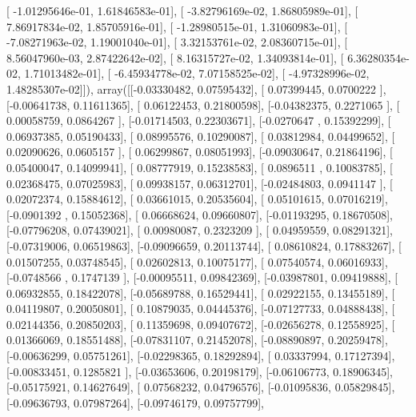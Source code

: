\documentclass{article}
\begin{document}
       [ -1.01295646e-01,   1.61846583e-01],
       [ -3.82796169e-02,   1.86805989e-01],
       [  7.86917834e-02,   1.85705916e-01],
       [ -1.28980515e-01,   1.31060983e-01],
       [ -7.08271963e-02,   1.19001040e-01],
       [  3.32153761e-02,   2.08360715e-01],
       [  8.56047960e-03,   2.87422642e-02],
       [  8.16315727e-02,   1.34093814e-01],
       [  6.36280354e-02,   1.71013482e-01],
       [ -6.45934778e-02,   7.07158525e-02],
       [ -4.97328996e-02,   1.48285307e-02]]), array([[-0.03330482,  0.07595432],
       [ 0.07399445,  0.0700222 ],
       [-0.00641738,  0.11611365],
       [ 0.06122453,  0.21800598],
       [-0.04382375,  0.2271065 ],
       [ 0.00058759,  0.0864267 ],
       [-0.01714503,  0.22303671],
       [-0.0270647 ,  0.15392299],
       [ 0.06937385,  0.05190433],
       [ 0.08995576,  0.10290087],
       [ 0.03812984,  0.04499652],
       [ 0.02090626,  0.0605157 ],
       [ 0.06299867,  0.08051993],
       [-0.09030647,  0.21864196],
       [ 0.05400047,  0.14099941],
       [ 0.08777919,  0.15238583],
       [ 0.0896511 ,  0.10083785],
       [ 0.02368475,  0.07025983],
       [ 0.09938157,  0.06312701],
       [-0.02484803,  0.0941147 ],
       [ 0.02072374,  0.15884612],
       [ 0.03661015,  0.20535604],
       [ 0.05101615,  0.07016219],
       [-0.0901392 ,  0.15052368],
       [ 0.06668624,  0.09660807],
       [-0.01193295,  0.18670508],
       [-0.07796208,  0.07439021],
       [ 0.00980087,  0.2323209 ],
       [ 0.04959559,  0.08291321],
       [-0.07319006,  0.06519863],
       [-0.09096659,  0.20113744],
       [ 0.08610824,  0.17883267],
       [ 0.01507255,  0.03748545],
       [ 0.02602813,  0.10075177],
       [ 0.07540574,  0.06016933],
       [-0.0748566 ,  0.1747139 ],
       [-0.00095511,  0.09842369],
       [-0.03987801,  0.09419888],
       [ 0.06932855,  0.18422078],
       [-0.05689788,  0.16529441],
       [ 0.02922155,  0.13455189],
       [ 0.04119807,  0.20050801],
       [ 0.10879035,  0.04445376],
       [-0.07127733,  0.04888438],
       [ 0.02144356,  0.20850203],
       [ 0.11359698,  0.09407672],
       [-0.02656278,  0.12558925],
       [ 0.01366069,  0.18551488],
       [-0.07831107,  0.21452078],
       [-0.08890897,  0.20259478],
       [-0.00636299,  0.05751261],
       [-0.02298365,  0.18292894],
       [ 0.03337994,  0.17127394],
       [-0.00833451,  0.1285821 ],
       [-0.03653606,  0.20198179],
       [-0.06106773,  0.18906345],
       [-0.05175921,  0.14627649],
       [ 0.07568232,  0.04796576],
       [-0.01095836,  0.05829845],
       [-0.09636793,  0.07987264],
       [-0.09746179,  0.09757799],
\end{document}
